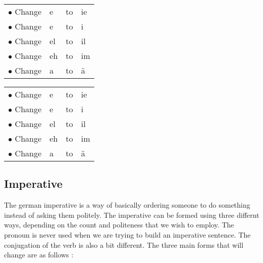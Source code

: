 \documentclass[a4paper,twocolumn,10pt]{article}
\newcommand{\newpar}
{\par \vspace{0.3cm}}
\begin{document}

\vspace{0.3cm}
\begin{tabular}{l l l l}

\rowcolor{white} $\bullet$ Change & e  & to & ie\\
\rowcolor{white} $\bullet$ Change & e  & to & i\\
\rowcolor{white} $\bullet$ Change & el & to & il\\
\rowcolor{white} $\bullet$ Change & eh & to & im\\
\rowcolor{white} $\bullet$ Change & a  & to & ä\\

\end{tabular}
\vspace{0.3cm}
\newline


\vspace{0.3cm}
\begin{tabular}{l l l l}

\rowcolor{white} $\bullet$ Change & e  & to & ie\\
\rowcolor{white} $\bullet$ Change & e  & to & i\\
\rowcolor{white} $\bullet$ Change & el & to & il\\
\rowcolor{white} $\bullet$ Change & eh & to & im\\
\rowcolor{white} $\bullet$ Change & a  & to & ä\\

\end{tabular}
\vspace{0.3cm}
\newline


\subsection{Imperative}
\label{ssec:imperative}

The german imperative is a way of basically ordering someone to do something
instead of asking them politely. The imperative can be formed using three
differnt ways, depending on the count and politeness that we wish to employ. The
pronoun is never used when we are trying to build an imperative sentence. The
conjugation of the verb is also a bit different. The three main forms that will
change are as follows :\newpar
\end{document}
